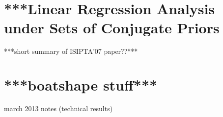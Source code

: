 \section{***Linear Regression Analysis under Sets of Conjugate Priors}
\label{sec:isipta07}

***short summary of ISIPTA'07 paper??***


\section{***boatshape stuff***}
\label{sec:boatshape}


march 2013 notes (technical results)


